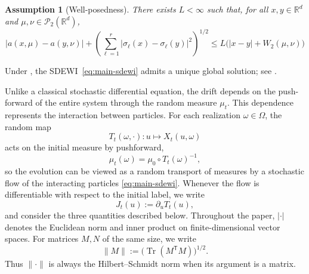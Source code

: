 \documentclass{tsp-short}
\newtheorem{assumption}{Assumption}
\theoremstyle{remark}
\theoremstyle{definition}
\newcommand{\R}{\mathbb{R}} %
\newcommand{\cP}{\mathcal{P}} %
\begin{document}
\begin{assumption}[Well-posedness]\label{ass:wellposedness}
	There exists \(L<\infty\) such that, for all
	\(x,y\in\R^d\) and
	\(\mu,\nu\in\cP_2(\R^d)\),
	\begin{equation*}
		|a(x,\mu)-a(y,\nu)| + \left( \sum_{\ell=1}^{r} |\sigma_\ell(x)-\sigma_\ell(y)|^2 \right)^{1/2}  \le L\bigl(|x-y|+W_2(\mu,\nu)\bigr)
	\end{equation*}
\end{assumption}

Under , the SDEWI~\eqref{eq:main-sdewi} admits a unique global solution; see
\cite[Theorem~2.3.1]{dorogovtsev2023}.

Unlike a classical stochastic differential equation, the drift depends on the push-forward of the entire system through the random measure
\(\mu_t \).
This dependence represents the interaction between particles. For each realization \(\omega \in \Omega\),
the random map
\begin{equation*}
	T_t(\omega,\cdot):u\mapsto X_t(u,\omega)
\end{equation*}
acts on the initial measure by pushforward,
\begin{equation*}
	\mu_t(\omega)=\mu_0\circ T_t(\omega)^{-1},
\end{equation*}
so the evolution can be viewed as a random transport of measures by a stochastic flow of the interacting particles \eqref{eq:main-sdewi}.
Whenever the flow is differentiable with respect to the initial label, we write
\begin{equation*}
	J_t(u):=\partial_u T_t(u),
\end{equation*}
and consider the three quantities described below. Throughout the paper, \(|\cdot|\) denotes the Euclidean norm and
inner product on finite-dimensional vector spaces. For matrices \(M,N\) of the same size, we write
\begin{equation*}
	\|M\| := \bigl(\operatorname{Tr}(M^{\mathsf T}M)\bigr)^{1/2}.
\end{equation*}
Thus \(\|\cdot\|\) is always the Hilbert--Schmidt norm when its argument is a matrix.
\end{document}
